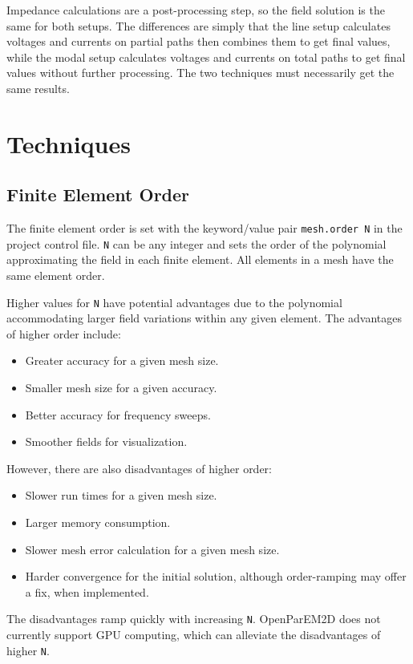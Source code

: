 \documentclass[titlepage]{article}
\renewcommand\_{\textunderscore\linebreak[1]}
\begin{document}
Impedance calculations are a post-processing step, so the field solution is the same for both setups.  The differences are simply that the line setup calculates voltages and currents on partial paths then combines them to get final values, while the modal setup calculates voltages and currents on total paths to get final values without further processing.  The two techniques must necessarily get the same results.

\section{Techniques}

\subsection{Finite Element Order}

The finite element order is set with the keyword/value pair \texttt{mesh.order N} in the project control file.  \texttt{N} can be any integer and sets the order of the polynomial approximating the field in each finite element.  All elements in a mesh have the same element order.

Higher values for \texttt{N} have potential advantages due to the polynomial accommodating larger field variations within any given element.  The advantages of higher order include:
\begin{itemize}
\item Greater accuracy for a given mesh size.
\item Smaller mesh size for a given accuracy.
\item Better accuracy for frequency sweeps.
\item Smoother fields for visualization.
\end{itemize}
\noindent However, there are also disadvantages of higher order:
\begin{itemize}
\item Slower run times for a given mesh size.
\item Larger memory consumption.
\item Slower mesh error calculation for a given mesh size.
\item Harder convergence for the initial solution, although order-ramping may offer a fix, when implemented.
\end{itemize}
\noindent The disadvantages ramp quickly with increasing \texttt{N}.
OpenParEM2D does not currently support GPU computing, which can alleviate the disadvantages of higher \texttt{N}.
\end{document}
